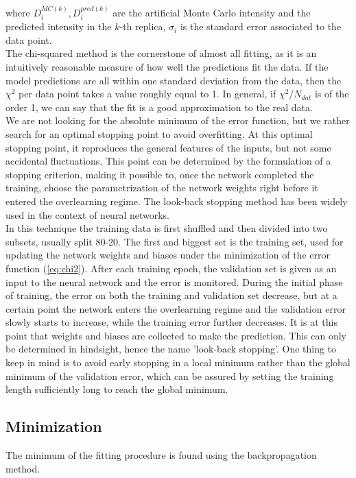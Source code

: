 \documentclass[11pt,a4paper]{article}
\numberwithin{equation}{section}
\numberwithin{figure}{section}
\numberwithin{table}{section}
\begin{document}
where $D_i^{MC(k)}, D_i^{pred(k)}$ are the artificial Monte Carlo intensity and the predicted intensity in the $k$-th replica, $\sigma_i$ is the standard error associated to the data point. \\
The chi-squared method is the cornerstone of almost all fitting, as it is an intuitively reasonable measure of how well the predictions fit the data. If the model predictions are all within one standard deviation from the data, then the $\chi^2$ per data point takes a value roughly equal to 1. In general, if $\chi^2/N_{dat}$ is of the order 1, we can say that the fit is a good approximation to the real data. \\

We are not looking for the absolute minimum of the error function, but we rather search for an optimal stopping point to avoid overfitting. At this optimal stopping point, it reproduces the general features of the inputs, but not some accidental fluctuations. This point can be determined by the formulation of a stopping criterion, making it possible to, once the network completed the training, choose the parametrization of the network weights right before it entered the overlearning regime. The look-back stopping method has been widely used in the context of neural networks. \\
In this technique the training data is first shuffled and then divided into two subsets, usually split 80-20. The first and biggest set is the training set, used for updating the network weights and biases under the minimization of the error function (\ref{eq:chi2}). After each training epoch, the validation set is given as an input to the neural network and the error is monitored. During the initial phase of training, the error on both the training and validation set decrease, but at a certain point the network enters the overlearning regime and the validation error slowly starts to increase, while the training error further decreases. It is at this point that weights and biases are collected to make the prediction. This can only be determined in hindsight, hence the name 'look-back stopping'. One thing to keep in mind is to avoid early stopping in a local minimum rather than the global minimum of the validation error, which can be assured by setting the training length sufficiently long to reach the global minimum.

\subsection{Minimization}
The minimum of the fitting procedure is found using the backpropagation method. 
\end{document}
